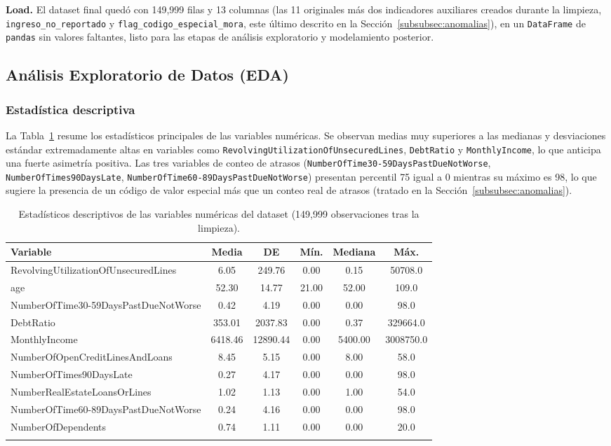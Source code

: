 \documentclass[pdflatex,sn-mathphys-num]{sn-jnl}
\begin{document}
\textbf{Load.} El dataset final quedó con 149{,}999 filas y 13 columnas (las 11 originales más dos indicadores auxiliares creados durante la limpieza, \texttt{ingreso\_no\_reportado} y \texttt{flag\_codigo\_especial\_mora}, este último descrito en la Sección~\ref{subsubsec:anomalias}), en un \texttt{DataFrame} de \texttt{pandas} sin valores faltantes, listo para las etapas de análisis exploratorio y modelamiento posterior.

\subsection{Análisis Exploratorio de Datos (EDA)}\label{subsec:eda}

\subsubsection{Estadística descriptiva}

La Tabla~\ref{tab:descriptivos} resume los estadísticos principales de las variables numéricas. Se observan medias muy superiores a las medianas y desviaciones estándar extremadamente altas en variables como \texttt{RevolvingUtilizationOfUnsecuredLines}, \texttt{DebtRatio} y \texttt{MonthlyIncome}, lo que anticipa una fuerte asimetría positiva. Las tres variables de conteo de atrasos (\texttt{NumberOfTime30-59DaysPastDueNotWorse}, \texttt{NumberOfTimes90DaysLate}, \texttt{NumberOfTime60-89DaysPastDueNotWorse}) presentan percentil 75 igual a 0 mientras su máximo es 98, lo que sugiere la presencia de un código de valor especial más que un conteo real de atrasos (tratado en la Sección~\ref{subsubsec:anomalias}).

\begin{table}[h]
\centering
\caption{Estadísticos descriptivos de las variables numéricas del dataset (149{,}999 observaciones tras la limpieza).}\label{tab:descriptivos}
\small
\begin{tabular}{@{}lccccc@{}}
\toprule
Variable & Media & DE & Mín. & Mediana & Máx. \\
\midrule
RevolvingUtilizationOfUnsecuredLines & 6.05 & 249.76 & 0.00 & 0.15 & 50708.0 \\
age & 52.30 & 14.77 & 21.00 & 52.00 & 109.0 \\
NumberOfTime30-59DaysPastDueNotWorse & 0.42 & 4.19 & 0.00 & 0.00 & 98.0 \\
DebtRatio & 353.01 & 2037.83 & 0.00 & 0.37 & 329664.0 \\
MonthlyIncome & 6418.46 & 12890.44 & 0.00 & 5400.00 & 3008750.0 \\
NumberOfOpenCreditLinesAndLoans & 8.45 & 5.15 & 0.00 & 8.00 & 58.0 \\
NumberOfTimes90DaysLate & 0.27 & 4.17 & 0.00 & 0.00 & 98.0 \\
NumberRealEstateLoansOrLines & 1.02 & 1.13 & 0.00 & 1.00 & 54.0 \\
NumberOfTime60-89DaysPastDueNotWorse & 0.24 & 4.16 & 0.00 & 0.00 & 98.0 \\
NumberOfDependents & 0.74 & 1.11 & 0.00 & 0.00 & 20.0 \\
\botrule
\end{tabular}
\end{table}
\end{document}
